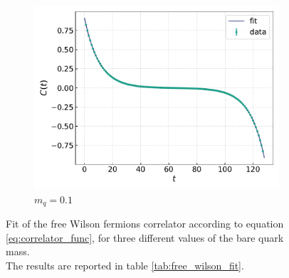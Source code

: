 \begin{figure}[h!]
\begin{subfigure}[b]{0.68\textwidth}
        \includegraphics[width=\textwidth]{figures/correlator/corrs_free/corr_medium.pdf}
        \caption{$m_q = 0.1$}        
    \end{subfigure}
    \caption[Fit of the correlator for free Wilson fermions.]{Fit of the free Wilson fermions correlator according to equation \eqref{eq:correlator_func}, for three different values of the bare quark mass. \\ The results are reported in table \ref{tab:free_wilson_fit}.}
    \label{fig:fit_wilson}
\end{figure}
\vfill
\newpage
